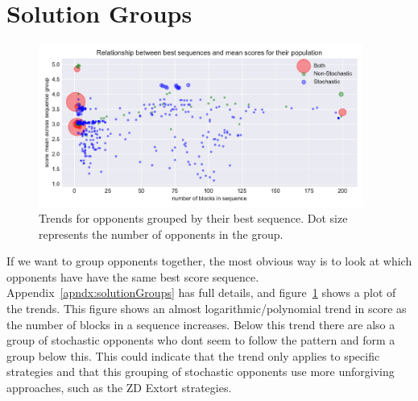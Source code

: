 \section{Solution Groups}\label{sec:solutionGroups}
\begin{figure}[ht]
    \includegraphics[width=0.95\textwidth, center]{./img/descriptive/sequence_scatter_colour.pdf}
    \caption{Trends for opponents grouped by their best sequence. Dot size represents the number of opponents in the group.}\label{fig:sequence_scatter}
\end{figure}

If we want to group opponents together, the most obvious way is to look at which opponents have have the same best score sequence.
Appendix~\ref{apndx:solutionGroups} has full details, and figure~\ref{fig:sequence_scatter} shows a plot of the trends. 
This figure shows an almost logarithmic/polynomial trend in score as the number of blocks in a sequence increases.
Below this trend there are also a group of stochastic opponents who dont seem to follow the pattern and form a group below this.
This could indicate that the trend only applies to specific strategies and that this grouping of stochastic opponents use more unforgiving approaches, such as the ZD Extort strategies.

